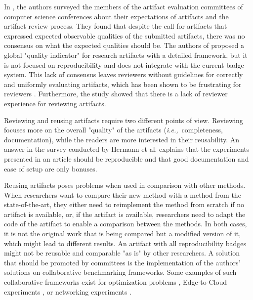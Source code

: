 \documentclass[sigconf,natbib=false]{acmart}
\newcommand{\ie}{\emph{i.e.,}}
\begin{document}
In \cite{hermann2020community}, the authors surveyed the members of the artifact evaluation committees of computer science conferences about their expectations of artifacts and the artifact review process. 
They found that despite the call for artifacts that expressed expected observable qualities of the submitted artifacts, there was no consensus on what the expected qualities should be.
The authors of \cite{castell2024towards} proposed a global "quality indicator" for research artifacts with a detailed framework, but it is not focused on reproducibility and does not integrate with the current badge system.
This lack of consensus leaves reviewers without guidelines for correctly and uniformly evaluating artifacts, which has been shown to be frustrating for reviewers \cite{beller2020will}.
Furthermore, the study showed that there is a lack of reviewer experience for reviewing artifacts.

Reviewing and reusing artifacts require two different points of view.
Reviewing focuses more on the overall "quality" of the artifacts (\ie\ completeness, documentation), while the readers are more interested in their reusability.
An answer in the survey conducted by Hermann et al. \cite{hermann2020community} explains that the experiments presented in an article should be reproducible and that good documentation and ease of setup are only bonuses.

Reusing artifacts poses problems when used in comparison with other methods.
When researchers want to compare their new method with a method from the state-of-the-art, they either need to reimplement the method from scratch if no artifact is available, or, if the artifact is available, researchers need to adapt the code of the artifact to enable a comparison between the methods.
In both cases, it is not the original work that is being compared but a modified version of it, which might lead to different results.
An artifact with all reproducibility badges might not be reusable and comparable "as is" by other researchers.
A solution that should be promoted by committees is the implementation of the authors' solutions on collaborative benchmarking frameworks.
Some examples of such collaborative frameworks exist for optimization problems \cite{moreau2022benchopt}, Edge-to-Cloud experiments \cite{rosendo2023kheops}, or networking experiments \cite{sharma2017towards}.
\end{document}
